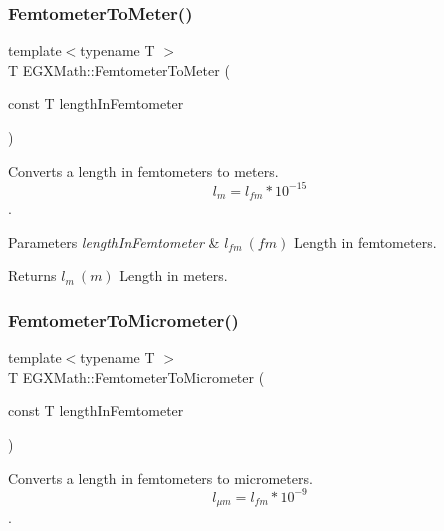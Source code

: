 \subsubsection{\texorpdfstring{Femtometer\+To\+Meter()}{FemtometerToMeter()}}
{\footnotesize\ttfamily template$<$typename T $>$ \\
T E\+G\+X\+Math\+::\+Femtometer\+To\+Meter (\begin{DoxyParamCaption}\item[{const T}]{length\+In\+Femtometer }\end{DoxyParamCaption})}



Converts a length in femtometers to meters. \[ l_{m}=l_{fm} * 10^{-15} \]. 


\begin{DoxyParams}{Parameters}
{\em length\+In\+Femtometer} & $ l_{fm}\ (fm)$ Length in femtometers. \\
\hline
\end{DoxyParams}
\begin{DoxyReturn}{Returns}
$ l_{m}\ (m)$ Length in meters. 
\end{DoxyReturn}
\mbox{\label{group___e_g_x_math-_conversions-_length_conversions-_femtometer-_s_i_gac965667884f7a3449072effb83260fe8}} 
\subsubsection{\texorpdfstring{Femtometer\+To\+Micrometer()}{FemtometerToMicrometer()}}
{\footnotesize\ttfamily template$<$typename T $>$ \\
T E\+G\+X\+Math\+::\+Femtometer\+To\+Micrometer (\begin{DoxyParamCaption}\item[{const T}]{length\+In\+Femtometer }\end{DoxyParamCaption})}



Converts a length in femtometers to micrometers. \[ l_{\mu m}=l_{fm} * 10^{-9} \]. 

